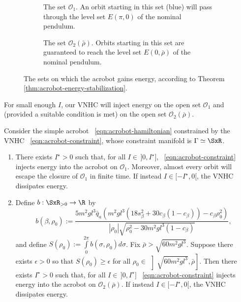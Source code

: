 \begin{figure}
    \centering
    \begin{subfigure}[t]{0.45\textwidth}
        
        \caption{The set \(\mathcal{O}_1\). An orbit starting in this set (blue)
            will pass through the level set \(E(\pi,0)\) of the nominal pendulum.}
        \label{fig:acrobot-oscillation-domain}
    \end{subfigure}
    \hfill
    \begin{subfigure}[t]{0.45\textwidth}
        
        \caption{The set \(\mathcal{O}_2(\bar{\rho})\). Orbits starting in this
            set are guaranteed to reach the level set \(E(0,\bar{\rho})\) of the
            nominal pendulum.}
            \label{fig:acrobot-o2}
    \end{subfigure}
    \caption{The sets on which the acrobot gains energy, according to Theorem
        \ref{thm:acrobot-energy-stabilization}.}
\end{figure}

For small enough \(I\), our VNHC will inject energy on the open set
\(\mathcal{O}_1\) and (provided a suitable condition is met) on the open set
\(\mathcal{O}_2(\bar{\rho})\).

\begin{thm}\label{thm:acrobot-energy-stabilization}
    Consider the simple acrobot ~\eqref{eqn:acrobot-hamiltonian} constrained by
    the VNHC ~\eqref{eqn:acrobot-constraint}, whose
    constraint manifold is \(\Gamma \simeq \SxR\).
\begin{enumerate}
    \item There exists \(I^\star > 0\) such that, for all 
        \(I \in \,]0,I^\star]\), 
    ~\eqref{eqn:acrobot-constraint} injects energy into the acrobot on
    \(\mathcal{O}_1\).
    Moreover, almost every orbit will escape the closure of 
    \(\mathcal{O}_1\) in finite time.
    If instead \(I \in [-I^\star,0[\), the VNHC dissipates energy.
\item Define \(b : \SxR_{> 0} \rightarrow \R\) by
    \[
        b(\beta,\rho_0) := 
        \frac{5m^2 g l^3 \bar{q}_a \left(
            m^2gl^3\left(18s_\beta^2 + 30c_\beta(1 - c_\beta)\right)
            - c_\beta\rho_0^2
        \right)}{
        |\rho_0|\sqrt{\rho_0^2 - 30m^2gl^3(1 - c_\beta)}
        }
        ,
    \]
    and define \(S(\rho_0) := \int \limits_{0}^{2\pi} b(\sigma,\rho_0)d\sigma\).
    Fix \(\bar{\rho} > \sqrt{60m^2gl^3}\).
    Suppose there exists \(\epsilon > 0\) so that \(S(\rho_0) \geq \epsilon\) for
    all \(\rho_0 \in \, \left]\sqrt{60m^2gl^3}, \bar{\rho}\right]\).
    Then there exists \(I^\star > 0\) such that, for all 
    \(I \in \, ]0,I^\star]\)
    ~\eqref{eqn:acrobot-constraint} injects energy into the acrobot on
    \(\mathcal{O}_2(\bar{\rho})\).
    If instead \(I \in [-I^\star,0[\), the VNHC dissipates energy.
\end{enumerate}
\end{thm}

